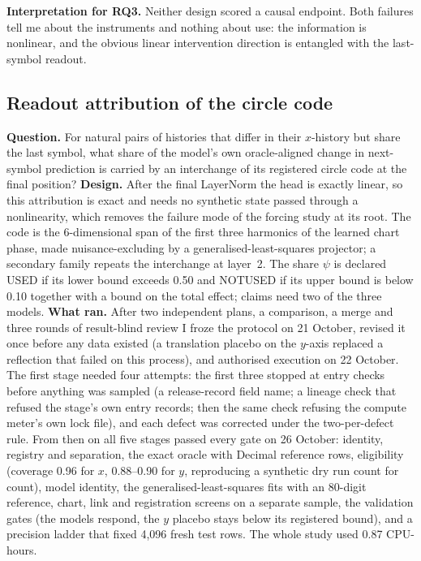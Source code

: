 \documentclass[11pt,a4paper]{article}
\DeclareRobustCommand{\_}{\ifmmode\origunderscore\else\textunderscore\allowbreak\fi}
\begin{document}
\textbf{Interpretation for RQ3.} Neither design scored a causal endpoint. Both failures tell me about
the instruments and nothing about use: the information is nonlinear, and the obvious linear
intervention direction is entangled with the last-symbol readout.

\subsection{Readout attribution of the circle code}
\textbf{Question.} For natural pairs of histories that differ in their $x$-history but share the
last symbol, what share of the model's own oracle-aligned change in next-symbol prediction is
carried by an interchange of its registered circle code at the final position?
\textbf{Design.} After the final LayerNorm the head is exactly linear, so this attribution is
exact and needs no synthetic state passed through a nonlinearity, which removes the failure mode
of the forcing study at its root. The code is the 6-dimensional span of the first three
harmonics of the learned chart phase, made nuisance-excluding by a generalised-least-squares
projector; a secondary family repeats the interchange at layer~2. The share $\psi$ is declared
USED if its lower bound exceeds 0.50 and NOT\_USED if its upper bound is below 0.10 together with
a bound on the total effect; claims need two of the three models.
\textbf{What ran.} After two independent plans, a comparison, a merge and three rounds of
result-blind review I froze the protocol on 21 October, revised it once before any data existed
(a translation placebo on the $y$-axis replaced a reflection that failed on this process), and
authorised execution on 22 October. The first stage needed four attempts: the first three
stopped at entry checks before anything was sampled (a release-record field name; a lineage
check that refused the stage's own entry records; then the same check refusing the compute
meter's own lock file), and each defect was corrected under the two-per-defect rule. From
then on all five stages passed every gate on 26 October: identity, registry and separation,
the exact oracle with Decimal reference rows, eligibility (coverage 0.96 for $x$, 0.88--0.90
for $y$, reproducing a synthetic dry run count for count), model identity, the
generalised-least-squares fits with an 80-digit reference, chart, link and registration
screens on a separate sample, the validation gates (the models respond, the $y$ placebo stays
below its registered bound), and a precision ladder that fixed 4,096 fresh test rows. The whole study used
0.87 CPU-hours.
\end{document}
